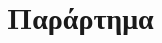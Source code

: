 \appendix
\chapter*{Παράρτημα}
\renewcommand{\thesection}{\Alph{section}}
\renewcommand\thefigure{\thesection. \arabic{figure}}
\setcounter{figure}{0} 

